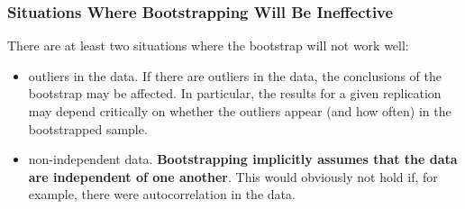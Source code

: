 \subsubsection{Situations Where Bootstrapping Will Be Ineffective}
There are at least two situations where the bootstrap will not work well:
\begin{itemize}
	\item outliers in the data. If there are outliers in the data, the conclusions of the bootstrap may be affected. In particular, the results for a given replication may depend critically on whether the outliers appear (and how often) in the bootstrapped sample. 
	\item non-independent data. \textbf{\color{blue}Bootstrapping implicitly assumes that the data are independent of one another}. This would obviously not hold if, for example, there were autocorrelation in the data.
\end{itemize}


